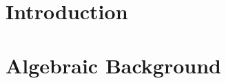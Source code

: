 






\maketitle


\begin{Preface}

%
%
%
%
%
%


%
%


\tableofcontents

\end{Preface}


\pagestyle{fancyplain}




\chapter{Introduction} 
\label{chap:intro} 
\doublespacing


\mediumspacing

\chapter{Algebraic Background} 
\label{chap:algbackground} 
\doublespacing


